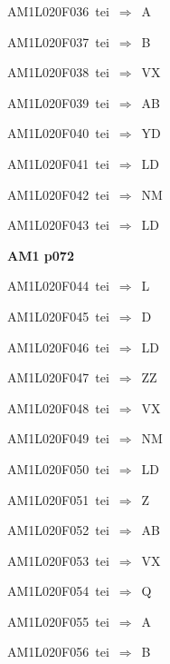 {\sixrm AM1L020F036\ {\sixit tei}\ }$\Rightarrow$\ A\par\smallskip
{\sixrm AM1L020F037\ {\sixit tei}\ }$\Rightarrow$\ B\par\smallskip
{\sixrm AM1L020F038\ {\sixit tei}\ }$\Rightarrow$\ VX\par\smallskip
{\sixrm AM1L020F039\ {\sixit tei}\ }$\Rightarrow$\ AB\par\smallskip
{\sixrm AM1L020F040\ {\sixit tei}\ }$\Rightarrow$\ YD\par\smallskip
{\sixrm AM1L020F041\ {\sixit tei}\ }$\Rightarrow$\ LD\par\smallskip
{\sixrm AM1L020F042\ {\sixit tei}\ }$\Rightarrow$\ NM\par\smallskip
{\sixrm AM1L020F043\ {\sixit tei}\ }$\Rightarrow$\ LD\par\smallskip

\par\vfill\eject
{\bf\hfill AM1 p072\hfill\hbox{}}\par\bigskip
{\sixrm AM1L020F044\ {\sixit tei}\ }$\Rightarrow$\ L\par\smallskip
{\sixrm AM1L020F045\ {\sixit tei}\ }$\Rightarrow$\ D\par\smallskip
{\sixrm AM1L020F046\ {\sixit tei}\ }$\Rightarrow$\ LD\par\smallskip
{\sixrm AM1L020F047\ {\sixit tei}\ }$\Rightarrow$\ ZZ\par\smallskip
{\sixrm AM1L020F048\ {\sixit tei}\ }$\Rightarrow$\ VX\par\smallskip
{\sixrm AM1L020F049\ {\sixit tei}\ }$\Rightarrow$\ NM\par\smallskip
{\sixrm AM1L020F050\ {\sixit tei}\ }$\Rightarrow$\ LD\par\smallskip
{\sixrm AM1L020F051\ {\sixit tei}\ }$\Rightarrow$\ Z\par\smallskip
{\sixrm AM1L020F052\ {\sixit tei}\ }$\Rightarrow$\ AB\par\smallskip
{\sixrm AM1L020F053\ {\sixit tei}\ }$\Rightarrow$\ VX\par\smallskip
{\sixrm AM1L020F054\ {\sixit tei}\ }$\Rightarrow$\ Q\par\smallskip
{\sixrm AM1L020F055\ {\sixit tei}\ }$\Rightarrow$\ A\par\smallskip
{\sixrm AM1L020F056\ {\sixit tei}\ }$\Rightarrow$\ B\par\smallskip

